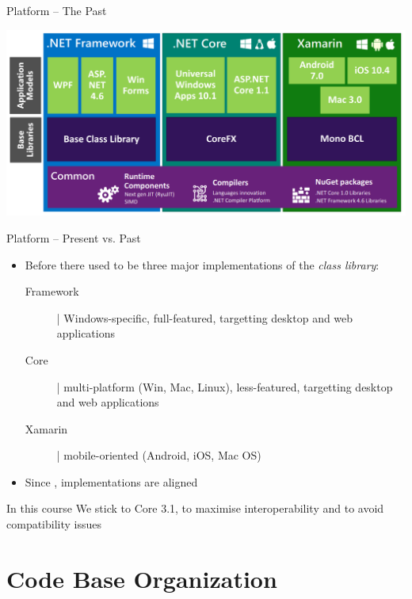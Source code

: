 \documentclass[presentation]{beamer}
\begin{document}
\begin{frame}{\dotnet Platform -- The Past}
    \begin{center}
        \includegraphics[width=\linewidth]{img/dotnet-overview-past.png}
    \end{center}
\end{frame}

\begin{frame}{\dotnet Platform -- Present vs. Past}
    \begin{itemize}
        \item Before  there used to be three major implementations of the \emph{class library}:
        \begin{description}
            \item[\dotnet Framework] | Windows-specific, full-featured, targetting desktop and web applications
            \item[\dotnet Core] | multi-platform (Win, Mac, Linux), less-featured, targetting desktop and web applications
            \item[Xamarin] | mobile-oriented (Android, iOS, Mac OS) 
        \end{description}

        \vfill

        \item Since , implementations are aligned
    \end{itemize}

    \vfill

    \begin{alertblock}{In this course}\centering
        We stick to \alert{\dotnet Core 3.1}, to maximise interoperability and to avoid compatibility issues
    \end{alertblock}
\end{frame}

\section{Code Base Organization}
\end{document}
